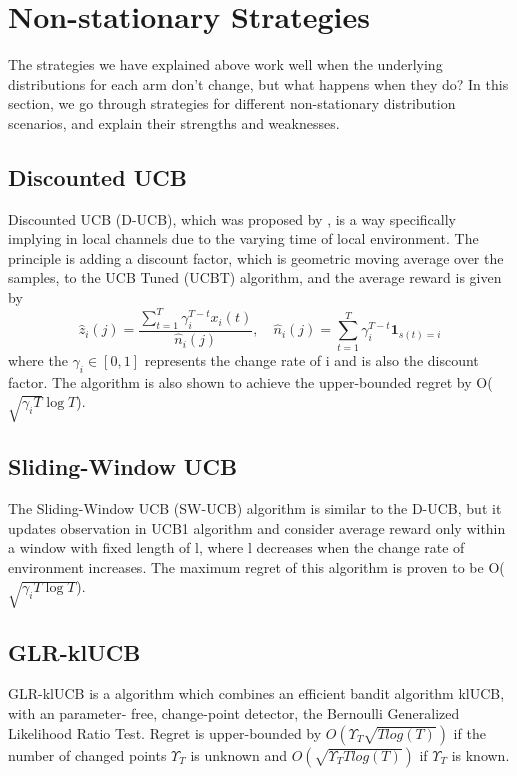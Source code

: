 \section{Non-stationary Strategies}\label{sec:non-stationary-strategies}
The strategies we have explained above work well when the underlying distributions for each arm don't change, but what happens when they do?
In this section, we go through strategies for different non-stationary distribution scenarios, and explain their strengths and weaknesses.

\subsection{Discounted UCB}\label{subsec:discounted-ucb}
Discounted UCB (D-UCB), which was proposed by \citep{kocsis2006discounted}, is a way specifically implying in local channels due to the varying time of local environment.
The principle is adding a discount factor, which is geometric moving average over the samples, to the UCB Tuned (UCBT) algorithm, and the average reward is given by
\begin{equation*}
    \hat{z}_i(j)=\frac{\sum_{t=1}^T\gamma_i^{T-t}x_i(t)}{\hat{n}_i(j)}, \quad
    {\hat{n}_i(j)}=\sum_{t=1}^T\gamma_i^{T-t}\textbf{1}_{s(t)=i}
\end{equation*}where the $\gamma_i \in[0,1]$ represents the change rate of i and is also the discount factor.
The algorithm is also shown to achieve the upper-bounded regret by O($\sqrt{\gamma_{i}T}\log{T}$)\citep{garivier2008upper}.

\subsection{Sliding-Window UCB}\label{subsec:sliding-window-ucb}
The Sliding-Window UCB (SW-UCB) algorithm is similar to the D-UCB, but it updates observation in UCB1 algorithm and consider average reward only within a window with fixed length of l, where l decreases when the change rate of environment increases.
The maximum regret of this algorithm is proven to be O($\sqrt{\gamma_{i}T\log{T}}$)\citep{garivier2008upper}.

\subsection{GLR-klUCB}\label{subsec:glr-klucb}
GLR-klUCB is a algorithm which combines an efficient bandit algorithm klUCB, with an parameter- free, change-point detector, the Bernoulli Generalized Likelihood Ratio Test.
Regret is upper-bounded by $ O(\Upsilon_T \sqrt{T log(T)} )$ if the number of changed points $\Upsilon_T $ is unknown and $ O(\sqrt{\Upsilon_T T log(T)} )$ if  $\Upsilon_T $ is known.\citep{Besson2019}


